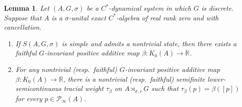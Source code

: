 \documentclass[a4paper, 12pt]{amsart}
\numberwithin{equation}{section}
\newcounter{theorem}
\newtheorem{lemma}[theorem]{Lemma}
\theoremstyle{remark}
\theoremstyle{definition}
\begin{document}
\begin{lemma}\label{lem.S.pi}
Let $(A,G,\sigma)$ be a $C^*$-dynamical system in which $G$ is discrete. Suppose that $A$
is a $\sigma$-unital exact $C^*$-algebra of real rank zero and with cancellation.
\begin{enumerate}
\item\label{lem.S.pi.i} If $S(A,G,\sigma)$ is simple and admits a nontrivial state, then there
    exists a faithful $G$-invariant positive additive map $\beta \colon K_0(A)\to
    {\mathbb{R}}$.
\item\label{lem.S.pi.ii} For any nontrivial (resp.\ faithful) $G$-invariant positive additive map
    $\beta \colon K_0(A)\to {\mathbb{R}}$, there is a nontrivial (resp.\ faithful) semifinite
    lower-semicontinuous tracial weight $\tau_\beta$ on $A\rtimes_{\sigma,r} G$ such
    that $\tau_\beta(p)=\beta([p])$ for every $p \in {\mathcal{P}}_\infty(A)$.
\end{enumerate}
\end{lemma}
\end{document}
